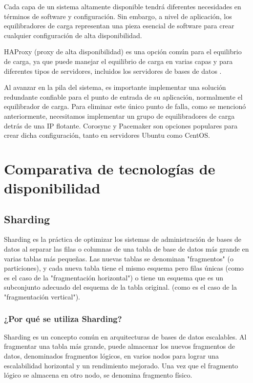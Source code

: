 \documentclass{article}
\begin{document}
\begin{multicols}{2}
Cada capa de un sistema altamente disponible tendrá diferentes necesidades en términos de software y configuración. Sin embargo, a nivel de aplicación, los equilibradores de carga representan una pieza esencial de software para crear cualquier configuración de alta disponibilidad.

HAProxy (proxy de alta disponibilidad) es una opción común para el equilibrio de carga, ya que puede manejar el equilibrio de carga en varias capas y para diferentes tipos de servidores, incluidos los servidores de bases de datos .

Al avanzar en la pila del sistema, es importante implementar una solución redundante confiable para el punto de entrada de su aplicación, normalmente el equilibrador de carga. Para eliminar este único punto de falla, como se mencionó anteriormente, necesitamos implementar un grupo de equilibradores de carga detrás de una IP flotante. Corosync y Pacemaker son opciones populares para crear dicha configuración, tanto en servidores Ubuntu como CentOS.


\section{Comparativa de tecnologías de disponibilidad}

\subsection{Sharding }
Sharding es la práctica de optimizar los sistemas de administración de bases de datos al separar las filas o columnas de una tabla de base de datos más grande en varias tablas más pequeñas. Las nuevas tablas se denominan "fragmentos" (o particiones), y cada nueva tabla tiene el mismo esquema pero filas únicas (como es el caso de la "fragmentación horizontal") o tiene un esquema que es un subconjunto adecuado del esquema de la tabla original. (como es el caso de la "fragmentación vertical").

\subsubsection{¿Por qué se utiliza Sharding? }

Sharding es un concepto común en arquitecturas de bases de datos escalables. Al fragmentar una tabla más grande, puede almacenar los nuevos fragmentos de datos, denominados fragmentos lógicos, en varios nodos para lograr una escalabilidad horizontal y un rendimiento mejorado. Una vez que el fragmento lógico se almacena en otro nodo, se denomina fragmento físico.


\end{multicols}
\end{document}
